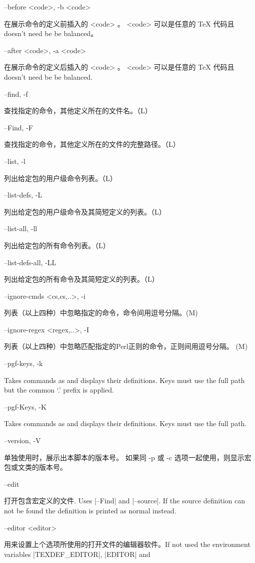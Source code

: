 \documentclass{article}
\newenvironment{options}{%
    \def\cstart{\begingroup\ttfamily\par\noindent\ignorespaces}%
    \def\csep{\endgroup\begingroup\list {}{}\item \relax}%
    \def\cend{\endlist\par\medskip\endgroup\cstart}%
    \cstart
}{%
    \endgroup
}
\begin{document}
  
\begin{options}
  
  
  

  --before \MacroArgs<code>, -b \MacroArgs<code>     \csep 在展示命令的定义前插入的 \MacroArgs<code> 。
                                                       \MacroArgs<code> 可以是任意的 TeX 代码且 doesn't need be be balanced。\cend
  --after  \MacroArgs<code>, -a \MacroArgs<code>     \csep 在展示命令的定义后插入的 \MacroArgs<code> 。
                                                       \MacroArgs<code> 可以是任意的 TeX 代码且 doesn't need be be balanced.\cend
  --find, -f                                         \csep 查找指定的命令，其他定义所在的文件名。（L）\cend
  --Find, -F                                         \csep 查找指定的命令，其他定义所在的文件的完整路径。（L）\cend
  --list, -l                                         \csep 列出给定包的用户级命令列表。（L）\cend
  --list-defs, -L                                    \csep 列出给定包的用户级命令及其简短定义的列表。（L）\cend
  --list-all, -ll                                    \csep 列出给定包的所有命令列表。（L）\cend
  --list-defs-all, -LL                               \csep 列出给定包的所有命令及其简短定义的列表。（L）\cend
  --ignore-cmds \MacroArgs<cs,cs,..>,  -i            \csep 列表（以上四种）中忽略指定的命令，命令间用逗号分隔。(M)\cend
  --ignore-regex \MacroArgs<regex,..>, -I            \csep 列表（以上四种）中忽略匹配指定的Perl正则的命令，正则间用逗号分隔。 (M)\cend
  --pgf-keys, -k                                     \csep Takes commands as  and displays their definitions. Keys must use the full path but the common `.\@cmd' prefix is applied.\cend
  --pgf-Keys, -K                                     \csep Takes commands as  and displays their definitions. Keys must use the full path.\cend
  --version, -V                                      \csep 单独使用时，展示出本脚本的版本号。
                                                       如果同 -p 或 -c 选项一起使用，则显示宏包或文类的版本号。\cend
  --edit                                             \csep 打开包含宏定义的文件. Uses |--Find| and |--source|.
                                                           If the source definition can not be found the definition is printed as normal instead. \cend
  --editor <editor>                                  \csep 用来设置上个选项所使用的打开文件的编辑器软件。If not used the environment variables |TEXDEF_EDITOR|, |EDITOR| and

\end{options}
\end{document}
